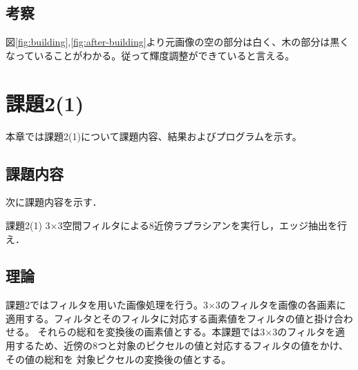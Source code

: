 \documentclass[11pt,a4paper,titlepage,dvipdfmx]{jarticle}
\begin{document}
  \subsection{考察}
    図\ref{fig:building},\ref{fig:after-building}より元画像の空の部分は白く、木の部分は黒くなっていることがわかる。従って輝度調整ができていると言える。

\section{課題2(1)}
  本章では課題2(1)について課題内容、結果およびプログラムを示す。
  \subsection{課題内容}
    次に課題内容を示す．
    \begin{itembox}[l]{課題2(1)}
      3$\times$3空間フィルタによる8近傍ラプラシアンを実行し，エッジ抽出を行え．
    \end{itembox}
  \subsection{理論}
    課題2ではフィルタを用いた画像処理を行う。3$\times$3のフィルタを画像の各画素に適用する。フィルタとそのフィルタに対応する画素値をフィルタの値と掛け合わせる。
    それらの総和を変換後の画素値とする。本課題では3$\times$3のフィルタを適用するため、近傍の8つと対象のピクセルの値と対応するフィルタの値をかけ、その値の総和を
    対象ピクセルの変換後の値とする。
\end{document}
